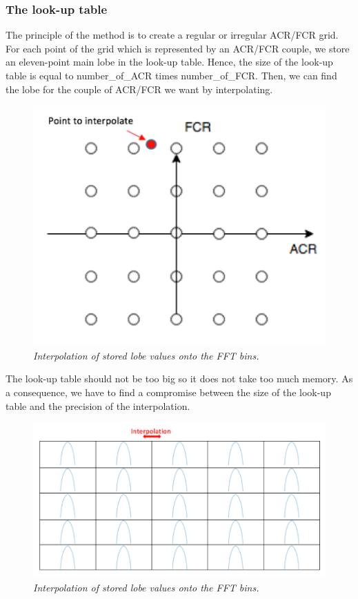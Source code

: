 \documentclass[]{article}
\begin{document}
\subsubsection{The look-up table}\label{the look-up table}
\hspace{15pt}
The principle of the method is to create a regular or irregular ACR/FCR grid. For each point of the grid which is represented by an ACR/FCR couple, we store an eleven-point main lobe in the look-up table. Hence, the size of the look-up table is equal to number\_of\_ACR times number\_of\_FCR. Then, we can find the lobe for the couple of ACR/FCR we want by interpolating.
\begin{figure}[H]
	\centering
	\includegraphics[scale=0.6]{grid.png}
	\caption{\it Interpolation of stored lobe values onto the FFT bins.}
\end{figure}

The look-up table should not be too big so it does not take too much memory. As a consequence, we have to find a compromise between the size of the look-up table and the precision of the interpolation.

\begin{figure}[H]
	\centering
	\includegraphics[scale=0.8]{LUT.png}
	\caption{\it Interpolation of stored lobe values onto the FFT bins.}
\end{figure}
\end{document}
